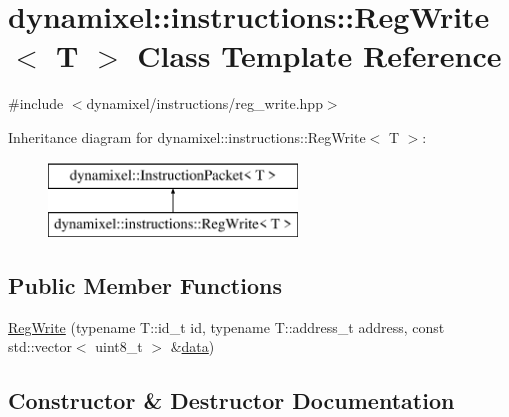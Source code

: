 \hypertarget{classdynamixel_1_1instructions_1_1_reg_write}{}\section{dynamixel\+:\+:instructions\+:\+:Reg\+Write$<$ T $>$ Class Template Reference}
\label{classdynamixel_1_1instructions_1_1_reg_write}


{\ttfamily \#include $<$dynamixel/instructions/reg\+\_\+write.\+hpp$>$}

Inheritance diagram for dynamixel\+:\+:instructions\+:\+:Reg\+Write$<$ T $>$\+:\begin{figure}[H]
\begin{center}
\leavevmode
\includegraphics[height=2.000000cm]{classdynamixel_1_1instructions_1_1_reg_write}
\end{center}
\end{figure}
\subsection*{Public Member Functions}
\begin{DoxyCompactItemize}
\item 
\hyperlink{classdynamixel_1_1instructions_1_1_reg_write_a9f55c5177607687106354ce76da7d7b4}{Reg\+Write} (typename T\+::id\+\_\+t id, typename T\+::address\+\_\+t address, const std\+::vector$<$ uint8\+\_\+t $>$ \&\hyperlink{classdynamixel_1_1_instruction_packet_a9a642ac2e80dc38172166b0508101bb8}{data})
\end{DoxyCompactItemize}


\subsection{Constructor \& Destructor Documentation}
